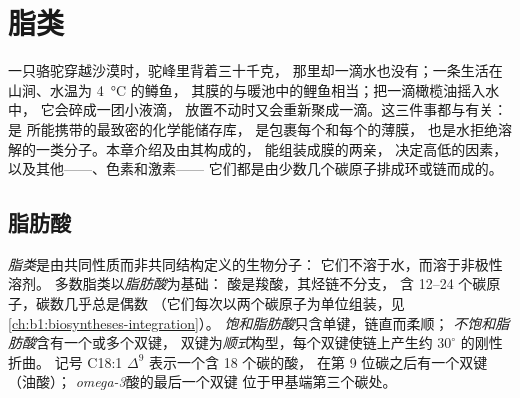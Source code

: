 \chapter{脂类}\label{ch:b1:lipids}

一只骆驼穿越沙漠时，驼峰里背着三十千克，
那里却一滴水也没有；一条生活在山涧、水温为 \qty{4}{\celsius} 的鳟鱼，
其膜的与暖池中的鲤鱼相当；把一滴橄榄油摇入水中，
它会碎成一团小液滴，
放置不动时又会重新聚成一滴。这三件事都与有关：是
所能携带的最致密的化学能储存库，
是包裹每个和每个的薄膜，
也是水拒绝溶解的一类分子。本章介绍及由其构成的，
能组装成膜的两亲，
决定高低的因素，
以及其他——、色素和激素——
它们都是由少数几个碳原子排成环或链而成的。

\section{脂肪酸}

\begin{definition}[脂类，脂肪酸]\label{def:b1:lipids:fattyacid}
\emph{脂类}是由共同性质而非共同结构定义的生物分子：
它们不溶于水，而溶于非极性溶剂。
多数脂类以\emph{脂肪酸}为基础：
酸是羧酸，其烃链不分支，
含 \qtyrange{12}{24}{} 个碳原子，碳数几乎总是偶数
（它们每次以两个碳原子为单位组装，见\cref{ch:b1:biosyntheses-integration}）。
\emph{饱和脂肪酸}只含单键，链直而柔顺；
\emph{不饱和脂肪酸}含有一个或多个双键，
双键为\emph{顺式}构型，每个双键使链上产生约 $30^\circ$ 的刚性折曲。
记号 C18:1 $\Delta^9$ 表示一个含 18 个碳的酸，
在第 9 位碳之后有一个双键（油酸）；
\emph{omega-3}酸的最后一个双键
位于甲基端第三个碳处。
\end{definition}

